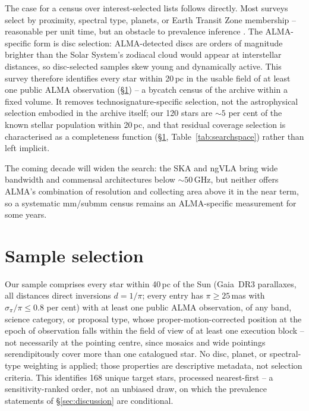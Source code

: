 \documentclass{openjournal}
\begin{document}
The case for a census over interest-selected lists follows directly.
Most surveys select by proximity, spectral type, planets, or Earth
Transit Zone membership -- reasonable per unit time, but an obstacle
to prevalence inference \citep{Margot2023}. The ALMA-specific form is
disc selection: ALMA-detected discs are orders of magnitude brighter
than the Solar System's zodiacal cloud would appear at interstellar
distances, so disc-selected samples skew young and dynamically
active. This survey therefore identifies every star within 20\,pc in
the usable field of at least one public ALMA observation
(\S\ref{sec:sample}) -- a bycatch census of the archive within a
fixed volume. It removes technosignature-specific selection, not the
astrophysical selection embodied in the archive itself; our 120 stars
are ${\sim}5$ per cent of the known stellar population within 20\,pc,
and that residual coverage selection is characterised as a
completeness function (\S\ref{sec:sample},
Table~\ref{tab:searchspace}) rather than left implicit.

The coming decade will widen the search: the SKA
\citep{SKA2015,SKA2026review} and ngVLA \citep{ngVLASETI2022} bring
wide bandwidth and commensal architectures below ${\sim}50$\,GHz, but
neither offers ALMA's combination of resolution and collecting area
above it in the near term, so a systematic mm/submm census remains an
ALMA-specific measurement for some years.

\section{Sample selection}
\label{sec:sample}

Our sample comprises every star within 40\,pc of the Sun (Gaia~DR3
parallaxes, all distances direct inversions $d = 1/\pi$; every entry
has $\pi \ge 25$\,mas with $\sigma_\pi/\pi \le 0.8$ per cent) with at
least one public ALMA observation, of any band, science category, or
proposal type, whose proper-motion-corrected position at the epoch of
observation falls within the field of view of at least one execution
block -- not necessarily at the pointing centre, since mosaics and
wide pointings serendipitously cover more than one catalogued star.
No disc, planet, or spectral-type weighting is applied; those
properties are descriptive metadata, not selection criteria. This identifies 168 unique target stars, processed
nearest-first -- a sensitivity-ranked order, not an unbiased draw, on
which the prevalence statements of \S\ref{sec:discussion} are
conditional.
\end{document}
